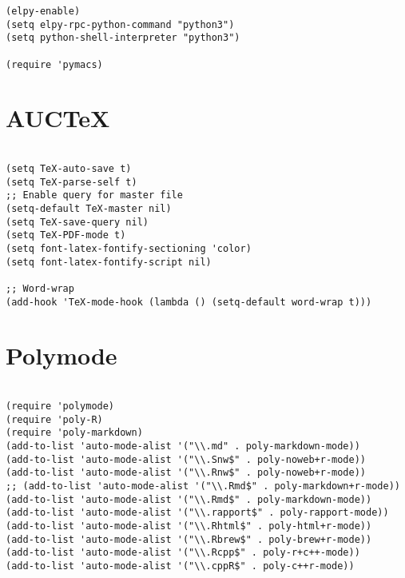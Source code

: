 \documentclass[11pt]{article}
\begin{document}
\begin{verbatim}
(elpy-enable)				
(setq elpy-rpc-python-command "python3")
(setq python-shell-interpreter "python3")

(require 'pymacs)

\end{verbatim}

\section*{AUCTeX}
\label{sec:orgc7bb284}
\begin{verbatim}

(setq TeX-auto-save t)			    
(setq TeX-parse-self t)
;; Enable query for master file
(setq-default TeX-master nil)		    
(setq TeX-save-query nil)		    
(setq TeX-PDF-mode t)			    
(setq font-latex-fontify-sectioning 'color) 
(setq font-latex-fontify-script nil)	    

;; Word-wrap
(add-hook 'TeX-mode-hook (lambda () (setq-default word-wrap t)))

\end{verbatim}

\section*{Polymode}
\label{sec:org58b544a}

\begin{verbatim}

(require 'polymode)
(require 'poly-R)
(require 'poly-markdown)
(add-to-list 'auto-mode-alist '("\\.md" . poly-markdown-mode))
(add-to-list 'auto-mode-alist '("\\.Snw$" . poly-noweb+r-mode))
(add-to-list 'auto-mode-alist '("\\.Rnw$" . poly-noweb+r-mode))
;; (add-to-list 'auto-mode-alist '("\\.Rmd$" . poly-markdown+r-mode))
(add-to-list 'auto-mode-alist '("\\.Rmd$" . poly-markdown-mode))
(add-to-list 'auto-mode-alist '("\\.rapport$" . poly-rapport-mode))
(add-to-list 'auto-mode-alist '("\\.Rhtml$" . poly-html+r-mode))
(add-to-list 'auto-mode-alist '("\\.Rbrew$" . poly-brew+r-mode))
(add-to-list 'auto-mode-alist '("\\.Rcpp$" . poly-r+c++-mode))
(add-to-list 'auto-mode-alist '("\\.cppR$" . poly-c++r-mode))
\end{verbatim}
\end{document}
